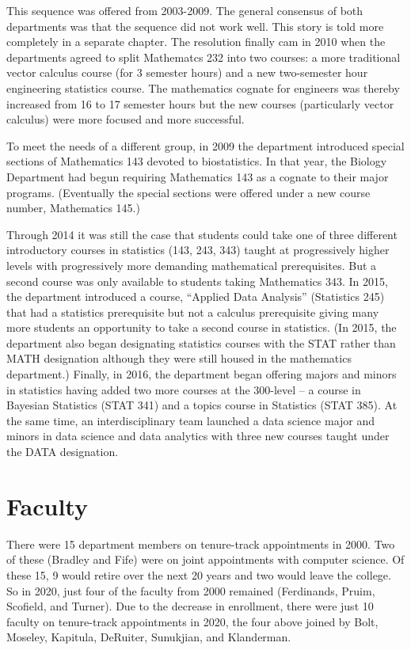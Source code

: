 \documentclass[
]{book}
\begin{document}
This sequence was offered from 2003-2009. The general consensus of both departments was that the sequence did not work well. This story is told more completely in a separate chapter. The resolution finally cam in 2010 when the departments agreed to split Mathematcs 232 into two courses: a more traditional vector calculus course (for 3 semester hours) and a new two-semester hour engineering statistics course. The mathematics cognate for engineers was thereby increased from 16 to 17 semester hours but the new courses (particularly vector calculus) were more focused and more successful.

To meet the needs of a different group, in 2009 the department introduced special sections of Mathematics 143 devoted to biostatistics. In that year, the Biology Department had begun requiring Mathematics 143 as a cognate to their major programs. (Eventually the special sections were offered under a new course number, Mathematics 145.)

Through 2014 it was still the case that students could take one of three different introductory courses in statistics (143, 243, 343) taught at progressively higher levels with progressively more demanding mathematical prerequisites. But a second course was only available to students taking Mathematics 343. In 2015, the department introduced a course, ``Applied Data Analysis'' (Statistics 245) that had a statistics prerequisite but not a calculus prerequisite giving many more students an opportunity to take a second course in statistics. (In 2015, the department also began designating statistics courses with the STAT rather than MATH designation although they were still housed in the mathematics department.) Finally, in 2016, the department began offering majors and minors in statistics having added two more courses at the 300-level -- a course in Bayesian Statistics (STAT 341) and a topics course in Statistics (STAT 385). At the same time, an interdisciplinary team launched a data science major and minors in data science and data analytics with three new courses taught under the DATA designation.

\hypertarget{faculty}{%
\section{Faculty}\label{faculty}}

There were 15 department members on tenure-track appointments in 2000. Two of these (Bradley and Fife) were on joint appointments with computer science. Of these 15, 9 would retire over the next 20 years and two would leave the college. So in 2020, just four of the faculty from 2000 remained (Ferdinands, Pruim, Scofield, and Turner). Due to the decrease in enrollment, there were just 10 faculty on tenure-track appointments in 2020, the four above joined by Bolt, Moseley, Kapitula, DeRuiter, Sunukjian, and Klanderman.
\end{document}

